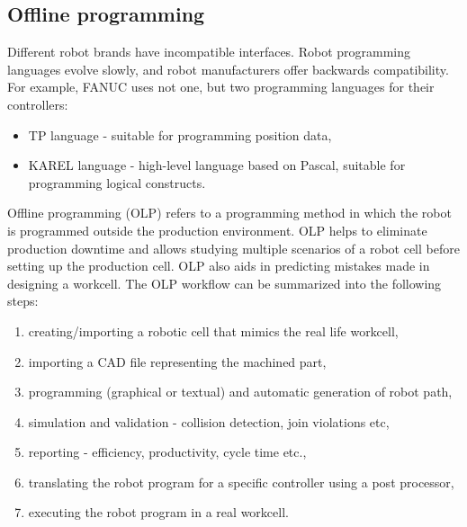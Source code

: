 \subsection{Offline programming}
Different robot brands have incompatible interfaces. Robot programming languages evolve slowly, and robot manufacturers offer backwards compatibility. For example, FANUC uses not one, but two programming languages for their controllers: 

\begin{itemize}

 \item TP language - suitable for programming position data,
 \item KAREL language - high-level language based on Pascal, suitable for programming logical constructs.

\end{itemize}

Offline programming  (OLP) refers to a programming method in which the robot is programmed outside the production environment. OLP helps to eliminate production downtime and allows studying multiple scenarios of a robot cell before setting up the production cell. OLP also aids in predicting mistakes made in designing a workcell. The OLP workflow can be summarized into the following steps:

\begin{enumerate}
  \item creating/importing a robotic cell that mimics the real life workcell,
  \item importing a CAD file representing the machined part,
  \item programming (graphical or textual) and automatic generation of robot path,
  \item simulation and validation - collision detection, join violations etc,
  \item reporting - efficiency, productivity, cycle time etc.,
  \item translating the robot program for a specific controller using a post processor,
  \item executing the robot program in a real workcell.
\end{enumerate}
